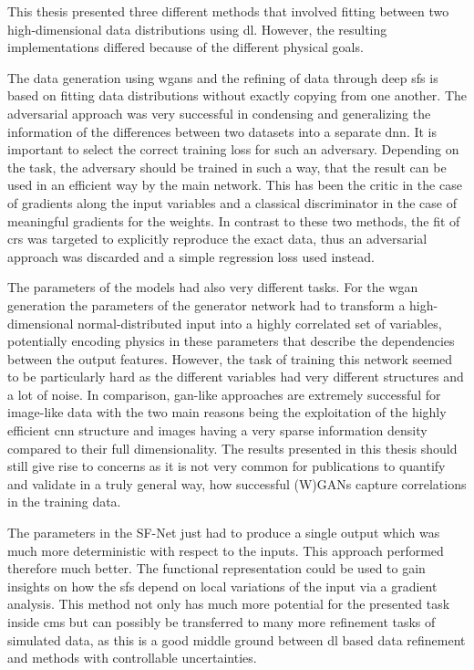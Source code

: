 

\glsresetall{}

This thesis presented three different methods that involved fitting between two high-dimensional data distributions using \gls{dl}. However, the resulting implementations differed because of the different physical goals.

The data generation using \glspl{wgan} and the refining of data through deep \glspl{sf} is based on fitting data distributions without exactly copying from one another. The adversarial approach was very successful in condensing and generalizing the information of the differences between two datasets into a separate \gls{dnn}. It is important to select the correct training loss for such an adversary. Depending on the task, the adversary should be trained in such a way, that the result can be used in an efficient way by the main network. This has been the critic in the case of gradients along the input variables and a classical discriminator in the case of meaningful gradients for the weights. In contrast to these two methods, the fit of \glspl{cr} was targeted to explicitly reproduce the exact data, thus an adversarial approach was discarded and a simple regression loss used instead.

The parameters of the models had also very different tasks. For the \gls{wgan} generation the parameters of the generator network had to transform a high-dimensional normal-distributed input into a highly correlated set of variables, potentially encoding physics in these parameters that describe the dependencies between the output features. However, the task of training this network seemed to be particularly hard as the different variables had very different structures and a lot of noise. In comparison, \gls{gan}-like approaches are extremely successful for image-like data with the two main reasons being the exploitation of the highly efficient \gls{cnn} structure and images having a very sparse information density compared to their full dimensionality. The results presented in this thesis should still give rise to concerns as it is not very common for publications to quantify and validate in a truly general way, how successful (W)GANs capture correlations in the training data. %

The parameters in the SF-Net just had to produce a single output which was much more deterministic with respect to the inputs. This approach performed therefore much better. The functional representation could be used to gain insights on how the \glspl{sf} depend on local variations of the input via a gradient analysis. This method not only has much more potential for the presented task inside \gls{cms} but can possibly be transferred to many more refinement tasks of simulated data, as this is a good middle ground between \gls{dl} based data refinement and methods with controllable uncertainties.

